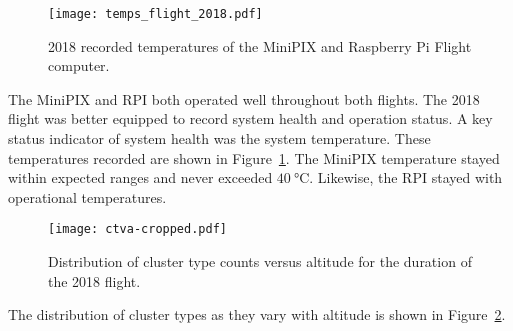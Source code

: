 \begin{figure}[H]
\centering
\texttt{[image: temps\_flight\_2018.pdf]} %
\caption{2018 recorded temperatures of the MiniPIX and Raspberry Pi Flight computer.}
\label{fig:temps_2018}
\end{figure}
%
The MiniPIX and RPI both operated well throughout both flights.  The 2018 flight was better equipped to record system health and operation status.  A key status indicator of system health was the system temperature.  These temperatures recorded are shown in Figure~\ref{fig:temps_2018}.  The MiniPIX temperature stayed within expected ranges and never exceeded $\SI{40}{\degreeCelsius}$.  Likewise, the RPI stayed with operational temperatures.
%
%
%
\begin{figure}[H]
\centering
\texttt{[image: ctva-cropped.pdf]} %
\caption{Distribution of cluster type counts versus altitude for the duration of the 2018 flight.}
\label{fig:cluster2018}
\end{figure}
The distribution of cluster types as they vary with altitude is shown in Figure~\ref{fig:cluster2018}.  %
